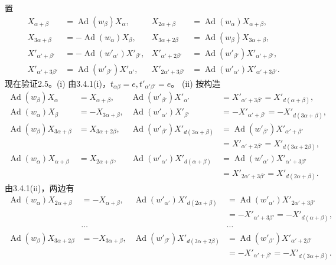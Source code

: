 置
\[\begin{aligned}X_{\alpha+\beta}&=\operatorname{Ad}(w_\beta)X_\alpha,&X_{2\alpha+\beta}&=\operatorname{Ad}(w_\alpha)X_{\alpha+\beta},\\X_{3\alpha+\beta}&=-\operatorname{Ad}(w_\alpha)X_\beta,&X_{3\alpha+2\beta}&=\operatorname{Ad}(w_\beta)X_{3\alpha+\beta},\\X'_{\alpha'+\beta'}&=-\operatorname{Ad}(w'_{\alpha'})X'_{\beta'},&X'_{\alpha'+2\beta'}&=\operatorname{Ad}(w'_{\beta'})X'_{\alpha'+\beta'},\\X'_{\alpha'+3\beta'}&=\operatorname{Ad}(w'_{\beta'})X'_{\alpha'},&X'_{2\alpha'+3\beta'}&=\operatorname{Ad}(w'_{\alpha'})X'_{\alpha'+3\beta'}.\end{aligned}\]
现在验证2.5。(i) 由3.4.1(i)，$t_{\alpha\beta}=e,t'_{\alpha'\beta'}=e$。
(ii) 按构造
\[\begin{aligned}\operatorname{Ad}(w_\beta)X_\alpha&=X_{\alpha+\beta},&\operatorname{Ad}(w'_{\beta'})X'_{\alpha'}&=X'_{\alpha'+3\beta'}=X'_{d(\alpha+\beta)},\\\operatorname{Ad}(w_\alpha)X_\beta&=-X_{3\alpha+\beta},&\operatorname{Ad}(w'_{\alpha'})X'_{\beta'}&=-X'_{\alpha'+\beta'}=-X'_{d(3\alpha+\beta)},\\\operatorname{Ad}(w_\beta)X_{3\alpha+\beta}&=X_{3\alpha+2\beta},&\operatorname{Ad}(w'_{\beta'})X'_{d(3\alpha+\beta)}&=\operatorname{Ad}(w'_{\beta'})X'_{\alpha'+\beta'}\\&&&=X'_{\alpha'+2\beta'}=X'_{d(3\alpha+2\beta)},\\\operatorname{Ad}(w_\alpha)X_{\alpha+\beta}&=X_{2\alpha+\beta},&\operatorname{Ad}(w'_{\alpha'})X'_{d(\alpha+\beta)}&=\operatorname{Ad}(w'_{\alpha'})X'_{\alpha'+3\beta'}\\&&&=X'_{2\alpha'+3\beta'}=X'_{d(2\alpha+\beta)}.\end{aligned}\]
由3.4.1(ii)，两边有
\[\begin{aligned}\operatorname{Ad}(w_\alpha)X_{2\alpha+\beta}&=-X_{\alpha+\beta},&\operatorname{Ad}(w'_{\alpha'})X'_{d(2\alpha+\beta)}&=\operatorname{Ad}(w'_{\alpha'})X'_{2\alpha'+3\beta'}\\&&&=-X'_{\alpha'+3\beta'}=-X'_{d(\alpha+\beta)},\\&\cdots&&\cdots\\\operatorname{Ad}(w_\beta)X_{3\alpha+2\beta}&=-X_{3\alpha+\beta},&\operatorname{Ad}(w'_{\beta'})X'_{d(3\alpha+2\beta)}&=\operatorname{Ad}(w'_{\beta'})X'_{\alpha'+2\beta'}\\&&&=-X'_{\alpha'+\beta'}=-X'_{d(3\alpha+\beta)}.\end{aligned}\]
